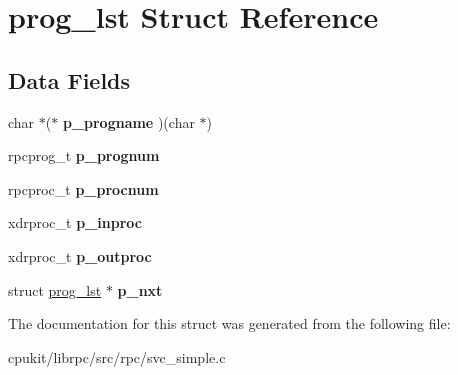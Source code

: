 \hypertarget{structprog__lst}{}\section{prog\+\_\+lst Struct Reference}
\label{structprog__lst}
\subsection*{Data Fields}
\begin{DoxyCompactItemize}
\item 
\mbox{\label{structprog__lst_a579aef4b1f57e226e552d4ce2eeb3756}} 
char $\ast$($\ast$ {\bfseries p\+\_\+progname} )(char $\ast$)
\item 
\mbox{\label{structprog__lst_af4de009465f1c11daaa5c38e876bb788}} 
rpcprog\+\_\+t {\bfseries p\+\_\+prognum}
\item 
\mbox{\label{structprog__lst_a15472ddabe45c4bfae189a9d93727d61}} 
rpcproc\+\_\+t {\bfseries p\+\_\+procnum}
\item 
\mbox{\label{structprog__lst_a3c4a6dc7894d24a0cc1f5f3f98df651f}} 
xdrproc\+\_\+t {\bfseries p\+\_\+inproc}
\item 
\mbox{\label{structprog__lst_ae9281ef7bb49a3b611563d27d8e22bad}} 
xdrproc\+\_\+t {\bfseries p\+\_\+outproc}
\item 
\mbox{\label{structprog__lst_acc476b7853f86986cc3e9f8eee48c74f}} 
struct \mbox{\hyperlink{structprog__lst}{prog\+\_\+lst}} $\ast$ {\bfseries p\+\_\+nxt}
\end{DoxyCompactItemize}


The documentation for this struct was generated from the following file\+:\begin{DoxyCompactItemize}
\item 
cpukit/librpc/src/rpc/svc\+\_\+simple.\+c\end{DoxyCompactItemize}
